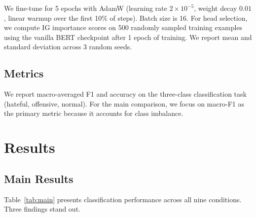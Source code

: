\documentclass{article}
\begin{document}
We fine-tune for 5 epochs with AdamW (learning rate $2 \times 10^{-5}$,
weight decay $0.01$, linear warmup over the first 10\% of steps). Batch
size is 16. For head selection, we compute IG importance scores on 500
randomly sampled training examples using the vanilla BERT checkpoint after
1 epoch of training. We report mean and standard deviation across 3
random seeds.

\subsection{Metrics}

We report macro-averaged F1 and accuracy on the three-class classification
task (hateful, offensive, normal). For the main comparison, we focus on
macro-F1 as the primary metric because it accounts for class imbalance.

\section{Results}
\label{sec:results}

\subsection{Main Results}

Table~\ref{tab:main} presents classification performance across all nine
conditions. Three findings stand out.
\end{document}

